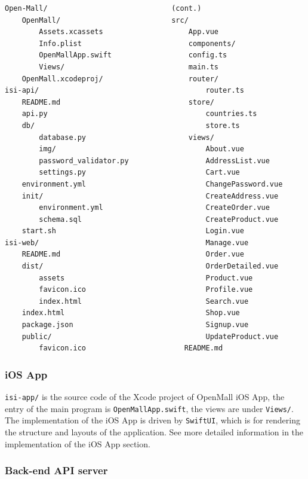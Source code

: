 \documentclass{article}
\begin{document}
\begin{verbatim}
Open-Mall/                             (cont.)
    OpenMall/                          src/
        Assets.xcassets                    App.vue
        Info.plist                         components/
        OpenMallApp.swift                  config.ts
        Views/                             main.ts
    OpenMall.xcodeproj/                    router/
isi-api/                                       router.ts
    README.md                              store/
    api.py                                     countries.ts
    db/                                        store.ts
        database.py                        views/
        img/                                   About.vue
        password_validator.py                  AddressList.vue
        settings.py                            Cart.vue
    environment.yml                            ChangePassword.vue
    init/                                      CreateAddress.vue
        environment.yml                        CreateOrder.vue
        schema.sql                             CreateProduct.vue
    start.sh                                   Login.vue
isi-web/                                       Manage.vue
    README.md                                  Order.vue
    dist/                                      OrderDetailed.vue
        assets                                 Product.vue
        favicon.ico                            Profile.vue
        index.html                             Search.vue
    index.html                                 Shop.vue
    package.json                               Signup.vue
    public/                                    UpdateProduct.vue
        favicon.ico                       README.md
\end{verbatim}

\subsubsection{iOS App}

\verb|isi-app/| is the source code of the Xcode project of OpenMall iOS App, the entry of the main program is \verb|OpenMallApp.swift|, the views are under \verb|Views/|. The implementation of the iOS App is driven by \verb|SwiftUI|, which is for rendering the structure and layouts of the application. See more detailed information in the implementation of the iOS App section.

\subsubsection{Back-end API server}
\end{document}
